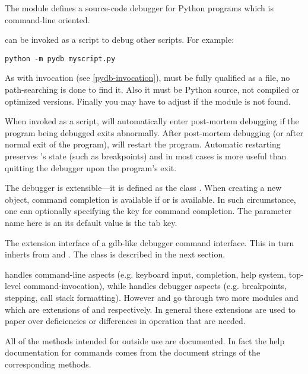 The module  defines a source-code
debugger for Python programs which is command-line
oriented. 

 can be invoked as a script to debug other scripts.  For
example:

\begin{verbatim}
python -m pydb myscript.py
\end{verbatim}

As with  invocation (see \ref{pydb-invocation}), 
must be fully qualified as a file, no path-searching is done to find
it. Also it must be Python source, not compiled or optimized
versions. Finally you may have to adjust  if the
module  is not found.

When invoked as a script,  will automatically enter
post-mortem debugging if the program being debugged exits
abnormally. After post-mortem debugging (or after normal exit of the
program),  will restart the program. Automatic restarting
preserves 's state (such as breakpoints) and in most cases
is more useful than quitting the debugger upon the program's exit.

The debugger is extensible---it is defined as the class
.  When
creating a new  object, command completion is available if
or  is available. In such circumstance, one can
optionally specifying the key for command completion. The parameter
name here is  an its default value is the tab key.

The  extension interface of  a gdb-like debugger
command interface. This in turn inherts from  and
. The  class is described in the next section.

 handles command-line aspects (e.g. keyboard input,
completion, help system, top-level command-invocation), while
 handles debugger aspects (e.g. breakpoints, stepping, call
stack formatting). However  and  go through two
more modules  and  which are extensions of
 and
 respectively. In general these extensions are used to
paper over deficiencies or differences in operation that are needed.

All of the methods intended for outside use are documented. In fact
the help documentation for commands comes from the document strings of
the corresponding methods.

